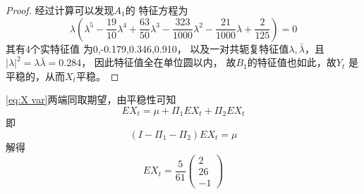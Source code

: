 \documentclass[cn]{homework}
\begin{document}
\begin{subproblem}[(\alph*)]
\begin{proof}
            经过计算可以发现$A_1$的
            特征方程为
            \[\lambda\left(\lambda^5-\frac{19}{10}\lambda^4
            +\frac{63}{50}\lambda^3-\frac{323}{1000}\lambda^2
            -\frac{21}{1000}\lambda+\frac{2}{125}\right)=0\]
            其有4个实特征值
            为0,-0.179,0.346,0.910，
            以及一对共轭复特征值$\lambda,\bar\lambda$，且
            $|\lambda|^2=\lambda\bar \lambda=0.284$，
            因此特征值全在单位圆以内，
            故$B_1$的特征值也如此，故$Y_t$
            是平稳的，从而$X_t$平稳。


        \end{proof}

        \item
        \cref{eq:X var}两端同取期望，由平稳性可知
        \[EX_t=\mu+\Pi_1EX_t+\Pi_2EX_t\]
        即
        \[(I-\Pi_1-\Pi_2)EX_t=\mu\]
        解得
        \[EX_t=\frac{5}{61}\begin{pmatrix}
            2\\
            26\\
            -1
        \end{pmatrix}\]


\end{subproblem}
\end{document}

